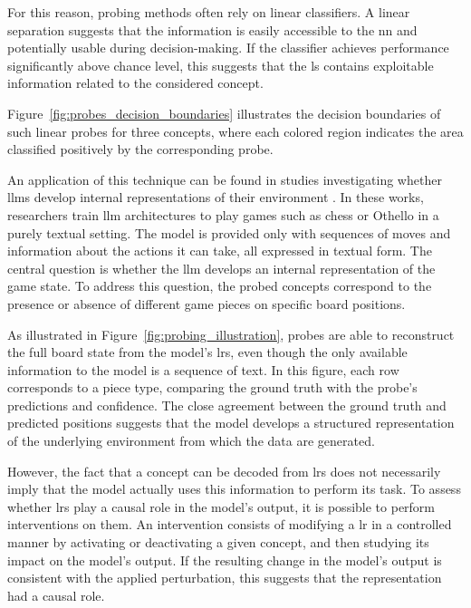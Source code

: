 For this reason, probing methods often rely on linear classifiers.
A linear separation suggests that the information is easily accessible to the \gls{nn} and potentially usable during decision-making.
If the classifier achieves performance significantly above chance level, this suggests that the \gls{ls} contains exploitable information related to the considered concept.

Figure~\ref{fig:probes_decision_boundaries} illustrates the decision boundaries of such linear probes for three concepts, where each colored region indicates the area classified positively by the corresponding probe.



An application of this technique can be found in studies investigating whether \glspl{llm} develop internal representations of their environment \parencite{li2024emergentworldrepresentationsexploring, karvonen2024emergentworldmodelslatent}.
In these works, researchers train \gls{llm} architectures to play games such as chess or Othello in a purely textual setting.
The model is provided only with sequences of moves and information about the actions it can take, all expressed in textual form.
The central question is whether the \gls{llm} develops an internal representation of the game state.
To address this question, the probed concepts correspond to the presence or absence of different game pieces on specific board positions.

As illustrated in Figure~\ref{fig:probing_illustration}, probes are able to reconstruct the full board state from the model's \glspl{lr}, even though the only available information to the model is a sequence of text.
In this figure, each row corresponds to a piece type, comparing the ground truth with the probe's predictions and confidence.
The close agreement between the ground truth and predicted positions suggests that the model develops a structured representation of the underlying environment from which the data are generated.



However, the fact that a concept can be decoded from \glspl{lr} does not necessarily imply that the model actually uses this information to perform its task.
To assess whether \glspl{lr} play a causal role in the model's output, it is possible to perform interventions on them.
An intervention consists of modifying a \gls{lr} in a controlled manner by activating or deactivating a given concept, and then studying its impact on the model's output.
If the resulting change in the model's output is consistent with the applied perturbation, this suggests that the representation had a causal role.

